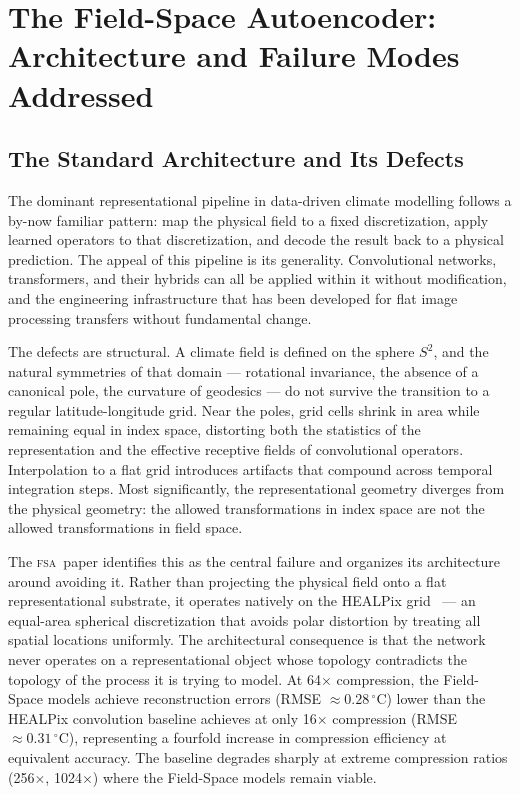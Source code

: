 \documentclass[11pt,a4paper]{article}
\theoremstyle{plain}
\theoremstyle{definition}
\theoremstyle{remark}
\newcommand{\FSA}{\textup{\textsc{fsa}}}
\begin{document}
\section{The Field-Space Autoencoder: Architecture and Failure Modes Addressed}
\label{sec:fsa}

\subsection{The Standard Architecture and Its Defects}

The dominant representational pipeline in data-driven climate modelling
follows a by-now familiar pattern: map the physical field to a fixed
discretization, apply learned operators to that discretization, and decode
the result back to a physical prediction. The appeal of this pipeline is
its generality. Convolutional networks, transformers, and their hybrids can
all be applied within it without modification, and the engineering
infrastructure that has been developed for flat image processing transfers
without fundamental change.

The defects are structural. A climate field is defined on the sphere
$S^2$, and the natural symmetries of that domain --- rotational invariance,
the absence of a canonical pole, the curvature of geodesics --- do not
survive the transition to a regular latitude-longitude grid. Near the poles,
grid cells shrink in area while remaining equal in index space, distorting
both the statistics of the representation and the effective receptive fields
of convolutional operators. Interpolation to a flat grid introduces
artifacts that compound across temporal integration steps. Most
significantly, the representational geometry diverges from the physical
geometry: the allowed transformations in index space are not the allowed
transformations in field space.

The \FSA\ paper identifies this as the central failure and organizes its
architecture around avoiding it. Rather than projecting the physical field
onto a flat representational substrate, it operates natively on the HEALPix
grid~\cite{Gorski2005} --- an equal-area spherical discretization that avoids
polar distortion by treating all spatial locations uniformly. The
architectural consequence is that the network never operates on a
representational object whose topology contradicts the topology of the
process it is trying to model. At 64$\times$ compression, the Field-Space
models achieve reconstruction errors (RMSE $\approx 0.28\,^\circ$C) lower
than the HEALPix convolution baseline achieves at only 16$\times$
compression (RMSE $\approx 0.31\,^\circ$C), representing a fourfold
increase in compression efficiency at equivalent accuracy. The baseline
degrades sharply at extreme compression ratios (256$\times$, 1024$\times$)
where the Field-Space models remain viable.
\end{document}
